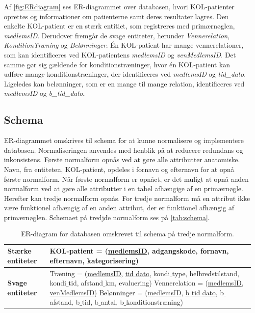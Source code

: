 \noindent
Af \autoref{fig:ERdiagram} ses ER-diagrammet over databasen, hvori KOL-patienter oprettes og informationer om patienterne samt deres resultater lagres. Den enkelte KOL-patient er en stærk entitiet, som registreres med primærnøglen, \textit{medlemsID}. Derudover fremgår de svage entiteter, herunder \textit{Vennerelation}, \textit{KonditionTræning} og \textit{Belønninger}. Én KOL-patient har mange vennerelationer, som kan identificeres ved KOL-patientens \textit{medlemsID} og \textit{venMedlemsID}. Det samme gør sig gældende for konditionstræninger, hvor én KOL-patient kan udføre mange konditionstræninger, der identificeres ved \textit{medlemsID} og \textit{tid\_dato}. Ligeledes kan belønninger, som er en mange til mange relation, identificeres ved \textit{medlemsID} og \textit{b\_tid\_dato}.

\subsection*{Schema}
ER-diagrammet omskrives til schema for at kunne normalisere og implementere databasen. Normaliseringen anvendes med henblik på at reducere redundans og inkonsistens.
Første normalform opnås ved at gøre alle attributter anatomiske. Navn, fra entiteten, KOL-patient, opdeles i fornavn og efternavn for at opnå første normalform. Når første normalform er opnået, er det muligt at opnå anden normalform ved at gøre alle attributter i en tabel afhængige af en primærnøgle. Herefter kan tredje normalform opnås. For tredje normalform må en attribut ikke være funktionel afhængig af en anden attribut, der er funktionel afhængig af primærnøglen. Schemaet på tredjde normalform ses på \autoref{tab:schema}.

\begin{table} [H]
	\centering
  \begin{tabular}{ | l | p{12cm} |} \hline
     \textbf{Stærke entiteter} & KOL-patient = (\underline{medlemsID}, adgangskode, fornavn, efternavn, kategorisering) \\ \hline
 	\textbf{Svage entiteter} & Træning = (\underline{medlemsID}, \underline{tid$\_$dato}, kondi$\_$type, helbredstilstand, kondi$\_$tid, afstand$\_$km, evaluering)
 \newline Vennerelation = (\underline{medlemsID}, \underline{venMedlemsID})
\newline Belønninger = (\underline{medlemsID}, \underline{b$\_$tid$\_$dato}, b$\_$afstand, b$\_$tid, b$\_$antal, b$\_$konditionstræning)\\ \hline
    \end{tabular}
    \caption{ER-diagram for databasen omskrevet til schema på tredje normalform.}
    \label{tab:schema}
\end{table}

